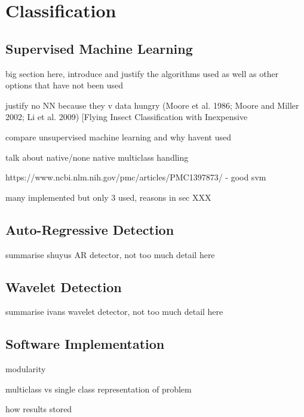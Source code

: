 \section{Classification}
\label{sec:pl-clf}

    \subsection{Supervised Machine Learning}
    \label{subsec:pl-clf-sup}
        \begin{sitemize}
            \item{big section here, introduce and justify the algorithms used as well as other options that have not been used}
            \item{justify no NN because they v data hungry  (Moore et al. 1986; Moore and Miller 2002; Li et al. 2009) [Flying Insect Classification with Inexpensive}
            \item{compare unsupervised machine learning and why havent used}
            \item{talk about native/none native multiclass handling}
            \item{https://www.ncbi.nlm.nih.gov/pmc/articles/PMC1397873/ - good svm}
            \item{many implemented but only 3 used, reasons in sec XXX}
        \end{sitemize}
    
    \subsection{Auto-Regressive Detection}
    \label{subsec:pl-clf-ar}
        \begin{sitemize}
            \item{summarise shuyus AR detector, not too much detail here}
        \end{sitemize}
    
    \subsection{Wavelet Detection}
    \label{subsec:pl-clf-wavelet}
        \begin{sitemize}
            \item{summarise ivans wavelet detector, not too much detail here}
        \end{sitemize}

    \subsection{Software Implementation}
    \label{subsec:pl-clf-software}
        \begin{sitemize}
            \item{modularity}
            \item{multiclass vs single class representation of problem}
            \item{how results stored}
        \end{sitemize}